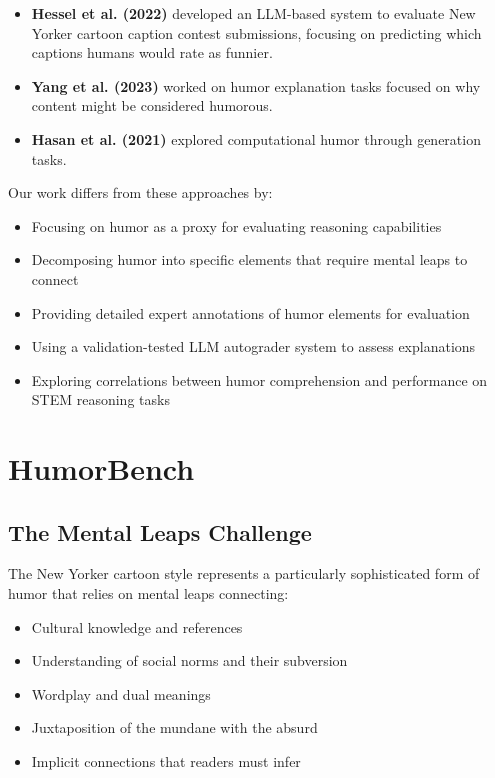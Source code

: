 \documentclass[twocolumn]{article}
\begin{document}
\begin{itemize}
    \item \textbf{Hessel et al. (2022)} developed an LLM-based system to evaluate New Yorker cartoon caption contest submissions, focusing on predicting which captions humans would rate as funnier.
    \item \textbf{Yang et al. (2023)} worked on humor explanation tasks focused on why content might be considered humorous.
    \item \textbf{Hasan et al. (2021)} explored computational humor through generation tasks.
\end{itemize}

Our work differs from these approaches by:
\begin{itemize}
    \item Focusing on humor as a proxy for evaluating reasoning capabilities
    \item Decomposing humor into specific elements that require mental leaps to connect
    \item Providing detailed expert annotations of humor elements for evaluation
    \item Using a validation-tested LLM autograder system to assess explanations
    \item Exploring correlations between humor comprehension and performance on STEM reasoning tasks
\end{itemize}


\section{HumorBench}

\subsection{The Mental Leaps Challenge}

The New Yorker cartoon style represents a particularly sophisticated form of humor that relies on mental leaps connecting:
\begin{itemize}
    \item Cultural knowledge and references
    \item Understanding of social norms and their subversion
    \item Wordplay and dual meanings
    \item Juxtaposition of the mundane with the absurd
    \item Implicit connections that readers must infer
\end{itemize}
\end{document}

